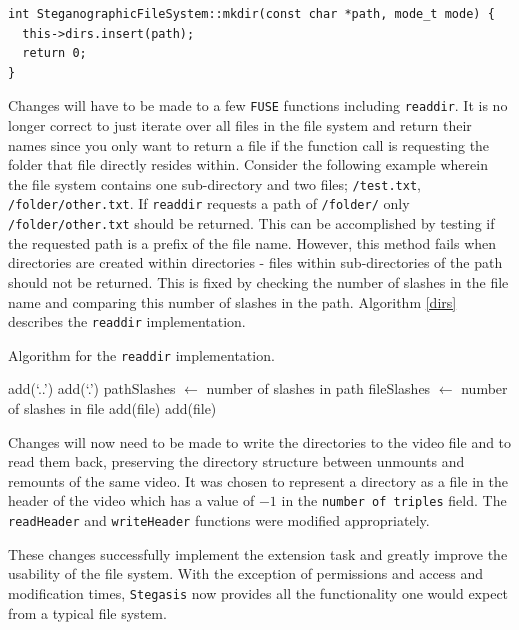 \documentclass[paper=a4, fontsize=11pt,twoside]{scrartcl}    %
\numberwithin{table}{section}
\numberwithin{figure}{section}
\numberwithin{algorithm}{section}
\begin{document}
\begin{lstlisting}[caption={\texttt{FUSE} mkdir implementation (\texttt{fs/stegfs.cc:158}).}, frame=single, label=dir]
int SteganographicFileSystem::mkdir(const char *path, mode_t mode) {
  this->dirs.insert(path);
  return 0;
}
\end{lstlisting}

Changes will have to be made to a few \texttt{FUSE} functions including \texttt{readdir}. It is no longer correct to just iterate over all files in the file system and return their names since you only want to return a file if the function call is requesting the folder that file directly resides within. Consider the following example wherein the file system contains one sub-directory and two files; \texttt{/test.txt}, \texttt{/folder/other.txt}. If \texttt{readdir} requests a path of \texttt{/folder/} only \texttt{/folder/other.txt} should be returned. This can be accomplished by testing if the requested path is a prefix of the file name. However, this method fails when directories are created within directories - files within sub-directories of the path should not be returned. This is fixed by checking the number of slashes in the file name and comparing this number of slashes in the path. Algorithm \ref{dirs} describes the \texttt{readdir} implementation.

\begin{algorithm}
\caption{Algorithm for the \texttt{readdir} implementation.}
\label{dirs}
\begin{algorithmic}[1]
\State add(`..')
\State add(`.')
\State pathSlashes $\gets$ number of slashes in path
	\State fileSlashes $\gets$ number of slashes in file
			\State add(file)
		\EndIf
		\State add(file)
	\EndIf
\EndFor
\end{algorithmic}
\end{algorithm}

Changes will now need to be made to write the directories to the video file and to read them back, preserving the directory structure between unmounts and remounts of the same video. It was chosen to represent a directory as a file in the header of the video which has a value of $-1$ in the \texttt{number of triples} field. The \texttt{readHeader} and \texttt{writeHeader} functions were modified appropriately.

These changes successfully implement the extension task and greatly improve the usability of the file system. With the exception of permissions and access and modification times, \texttt{Stegasis} now provides all the functionality one would expect from a typical file system.
\end{document}
